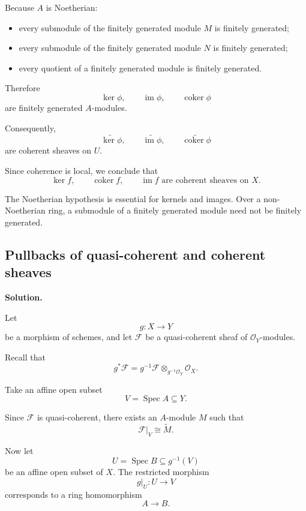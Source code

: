 Because \(A\) is Noetherian:

\begin{itemize}
	\item every submodule of the finitely generated module \(M\) is finitely generated;
	\item every submodule of the finitely generated module \(N\) is finitely generated;
	\item every quotient of a finitely generated module is finitely generated.
\end{itemize}

Therefore
\[
\ker\phi,
\qquad
\operatorname{im}\phi,
\qquad
\operatorname{coker}\phi
\]
are finitely generated \(A\)-modules.

Consequently,
\[
\widetilde{\ker\phi},
\qquad
\widetilde{\operatorname{im}\phi},
\qquad
\widetilde{\operatorname{coker}\phi}
\]
are coherent sheaves on \(U\).

Since coherence is local, we conclude that
\[
\boxed{
	\ker f,\qquad \operatorname{coker} f,\qquad \operatorname{im} f
	\text{ are coherent sheaves on }X.
}
\]

\begin{remark}
	The Noetherian hypothesis is essential for kernels and images. Over a non-Noetherian ring, a submodule of a finitely generated module need not be finitely generated.
\end{remark}

\subsection{Pullbacks of quasi-coherent and coherent sheaves}

\textbf{Solution.}

Let
\[
g:X\longrightarrow Y
\]
be a morphism of schemes, and let \(\mathcal{F}\) be a quasi-coherent sheaf of \(\mathcal{O}_Y\)-modules.

Recall that
\[
g^*\mathcal{F}
=
g^{-1}\mathcal{F}
\otimes_{g^{-1}\mathcal{O}_Y}
\mathcal{O}_X.
\]

Take an affine open subset
\[
V=\operatorname{Spec} A\subseteq Y.
\]

Since \(\mathcal{F}\) is quasi-coherent, there exists an \(A\)-module \(M\) such that
\[
\mathcal{F}|_V\cong \widetilde{M}.
\]

Now let
\[
U=\operatorname{Spec} B\subseteq g^{-1}(V)
\]
be an affine open subset of \(X\). The restricted morphism
\[
g|_U:U\longrightarrow V
\]
corresponds to a ring homomorphism
\[
A\longrightarrow B.
\]

